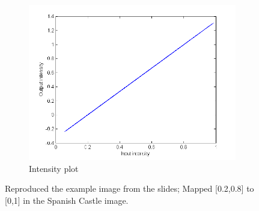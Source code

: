 \documentclass[a4paper]{article}
\begin{document}
\begin{figure}[H]
	\vspace{3mm}
	\begin{subfigure}[h]{0.48\textwidth}
		\centering
		\includegraphics[width=\textwidth]{linearContrast_plot1}
		\caption*{Intensity plot}
	\end{subfigure}	
\caption{Reproduced the example image from the slides; Mapped [0.2,0.8] to [0,1] in the Spanish Castle image.}
\label{fig:contrast-1}
\end{figure}
\end{document}
